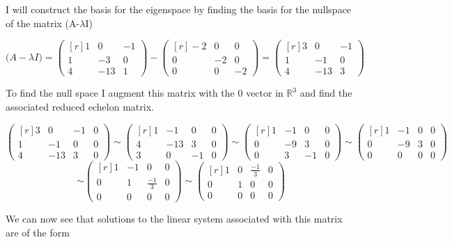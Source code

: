 \documentclass[11pt, oneside]{article}   	%
\begin{document}
 I will construct the basis for the eigenspace by finding the basis for the nullspace of the matrix (A-$\lambda$I)
 
 \[
 \big(A-\lambda I\big)= \begin{pmatrix*}[r]
 1&0&-1\\
 1&-3&0\\
 4&-13&1
 \end{pmatrix*}
- \begin{pmatrix*}[r]
-2&0&0\\
0&-2&0\\
0&0&-2
\end{pmatrix*}
=\begin{pmatrix*}[r]
 3&0&-1\\
 1&-1&0\\
 4&-13&3
 \end{pmatrix*}
\]

To find the null space I augment this matrix with the 0 vector in $\mathbb{R}^3$ and find the associated reduced echelon matrix.

\[
\begin{pmatrix*}[r]
3&0&-1&0\\
1&-1&0&0\\
4&-13&3&0
\end{pmatrix*}
\sim 
\begin{pmatrix*}[r]
1&-1&0&0\\
4&-13&3&0\\
3&0&-1&0
\end{pmatrix*}
\sim \begin{pmatrix*}[r]
1&-1&0&0\\
 0&-9&3&0\\
 0&3&-1&0
 \end{pmatrix*}
 \sim \begin{pmatrix*}[r]
1&-1&0&0\\
 0&-9&3&0\\
 0&0&0&0
 \end{pmatrix*}
 \]
 \[
 \sim \begin{pmatrix*}[r]
1&-1&0&0\\
 0&1&\frac{-1}{3}&0\\
 0&0&0&0
 \end{pmatrix*}
 \sim \begin{pmatrix*}[r]
1&0&\frac{-1}{3}&0\\
 0&1&0&0\\
 0&0&0&0
 \end{pmatrix*}
 \]
 
 We can now see that solutions to the linear system associated with this matrix are of the form 
 
\end{document}
